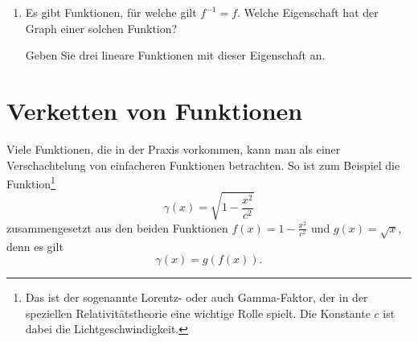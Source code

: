 \begin{enumerate}
          \begin{minipage}{0.5\textwidth}
          \end{minipage}
          \begin{minipage}{0.5\textwidth}
          \end{minipage}
    \item Es gibt Funktionen, für welche gilt $f^{-1}=f$. Welche Eigenschaft hat der Graph einer solchen Funktion?

          Geben Sie drei lineare Funktionen mit dieser Eigenschaft an.
\end{enumerate}
\newpage

\section{Verketten von Funktionen}
Viele Funktionen, die in der Praxis vorkommen, kann man als einer Verschachtelung von einfacheren Funktionen betrachten. So ist zum Beispiel die Funktion\footnote{Das ist der sogenannte Lorentz- oder auch Gamma-Faktor, der in der speziellen Relativitätstheorie eine wichtige Rolle spielt. Die Konstante $c$ ist dabei die Lichtgeschwindigkeit.}
\[\gamma(x)=\sqrt{1-\frac{x^2}{c^2}}\]
zusammengesetzt aus den beiden Funktionen $f(x)=1-\frac{x^2}{c^2}$ und $g(x)=\sqrt{x}$, denn es gilt
\[\gamma(x)=g(f(x)).\]


